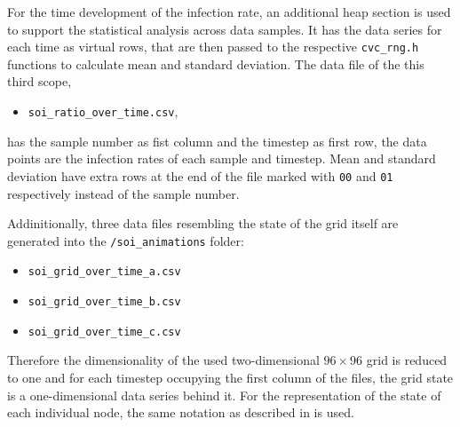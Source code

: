 For the time development of the infection rate, an additional heap section is used to support the statistical analysis across data samples. It has the data series for each time as virtual rows,
that are then passed to the respective \texttt{cvc\_rng.h} functions to calculate mean and standard deviation. The data file of the this third scope,
\begin{itemize}
    \item \texttt{soi\_ratio\_over\_time.csv},
\end{itemize}
has the sample number as fist column and the timestep as first row, the data points are the infection rates of each sample and timestep. 
Mean and standard deviation have extra rows at the end of the file marked with \texttt{00} and \texttt{01} respectively instead of the sample number.

Addinitionally, three data files resembling the state of the grid itself are generated into the \texttt{/soi\_animations} folder:
\begin{itemize}
    \item \texttt{soi\_grid\_over\_time\_a.csv}
    \item \texttt{soi\_grid\_over\_time\_b.csv}
    \item \texttt{soi\_grid\_over\_time\_c.csv}
\end{itemize}

Therefore the dimensionality of the used two-dimensional $96\times 96$ grid is reduced to one and for each timestep occupying the first column of the files, the grid state is a one-dimensional data series behind it.
For the representation of the state of each individual node, the same notation as described in  is used.


